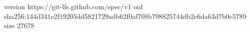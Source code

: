 version https://git-lfs.github.com/spec/v1
oid sha256:144d341e2f19205dd5821729adb62f0af708b798825744db2c6da63d7b0c5789
size 27678

